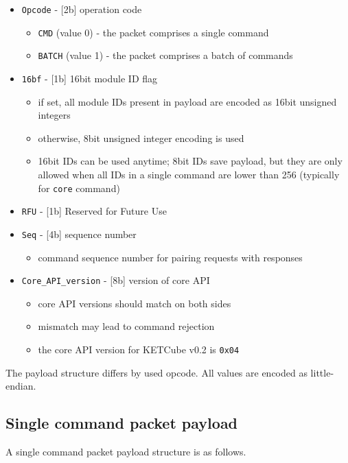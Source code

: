 \begin{itemize}
	\item \texttt{Opcode} - [2b] operation code
		\begin{itemize}
			\item \texttt{CMD} (value 0) - the packet comprises a single command
			\item \texttt{BATCH} (value 1) - the packet comprises a batch of commands
		\end{itemize}
	\item \texttt{16bf} - [1b] 16bit module ID flag
		\begin{itemize}
			\item if set, all module IDs present in payload are encoded as 16bit unsigned integers
			\item otherwise, 8bit unsigned integer encoding is used
			\item 16bit IDs can be used anytime; 8bit IDs save payload, but they are only allowed when all IDs in a single command are lower than 256 (typically for \texttt{core} command)
		\end{itemize}
	\item \texttt{RFU} - [1b] Reserved for Future Use
	\item \texttt{Seq} - [4b] sequence number
		\begin{itemize}
			\item command sequence number for pairing requests with responses
		\end{itemize}
	\item \texttt{Core\_API\_version} - [8b] version of core API
		\begin{itemize}
			\item core API versions should match on both sides
			\item mismatch may lead to command rejection
			\item the core API version for KETCube v0.2 is \texttt{0x04}
		\end{itemize}
\end{itemize}

The payload structure differs by used opcode. All values are encoded as little-endian.

\subsection{Single command packet payload}

A single command packet payload structure is as follows.


